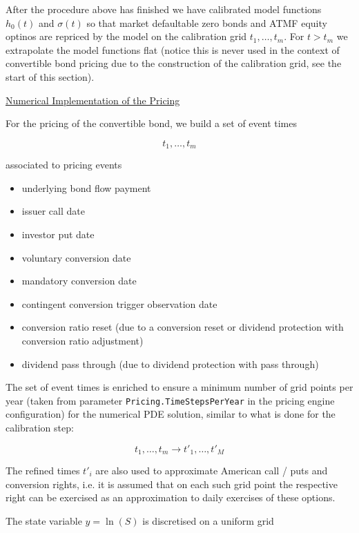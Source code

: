 After the procedure above has finished we have calibrated model functions $h_0(t)$ and $\sigma(t)$ so that market
defaultable zero bonds and ATMF equity optinos are repriced by the model on the calibration grid $t_1,\ldots,t_m$. For
$t > t_m$ we extrapolate the model functions flat (notice this is never used in the context of convertible bond pricing
due to the construction of the calibration grid, see the start of this section).

\underline{Numerical Implementation of the Pricing}

For the pricing of the convertible bond, we build a set of event times

\begin{equation}
  t_1, \ldots, t_m
\end{equation}

associated to pricing events

\begin{itemize}
\item underlying bond flow payment
\item issuer call date
\item investor put date
\item voluntary conversion date
\item mandatory conversion date
\item contingent conversion trigger observation date
\item conversion ratio reset (due to a conversion reset or dividend protection with conversion ratio adjustment)
\item dividend pass through (due to dividend protection with pass through)
\end{itemize}

The set of event times is enriched to ensure a minimum number of grid points per year (taken from parameter
\verb+Pricing.TimeStepsPerYear+ in the pricing engine configuration) for the numerical PDE solution, similar to what is
done for the calibration step:

\begin{equation}
  t_1, \ldots, t_m \rightarrow t'_1, \ldots, t'_M
\end{equation}

The refined times $t'_i$ are also used to approximate American call / puts and conversion rights, i.e. it is assumed
that on each such grid point the respective right can be exercised as an approximation to daily exercises of these
options.

The state variable $y=\ln(S)$ is discretised on a uniform grid

